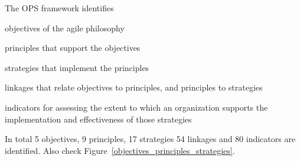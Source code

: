 
The OPS framework identifies 
\begin{inparaenum} [a\upshape)]
\item objectives of the agile philosophy
\item principles that support the objectives
\item strategies that implement the principles
\item linkages that relate objectives to
principles, and principles to strategies
\item indicators for assessing the extent to which an organization supports the implementation and effectiveness of those strategies
\end{inparaenum}


In total 5 objectives, 9 principles, 17 strategies 54 linkages and 80 indicators are identified. Also check Figure~\ref{objectives_principles_strategies}.

